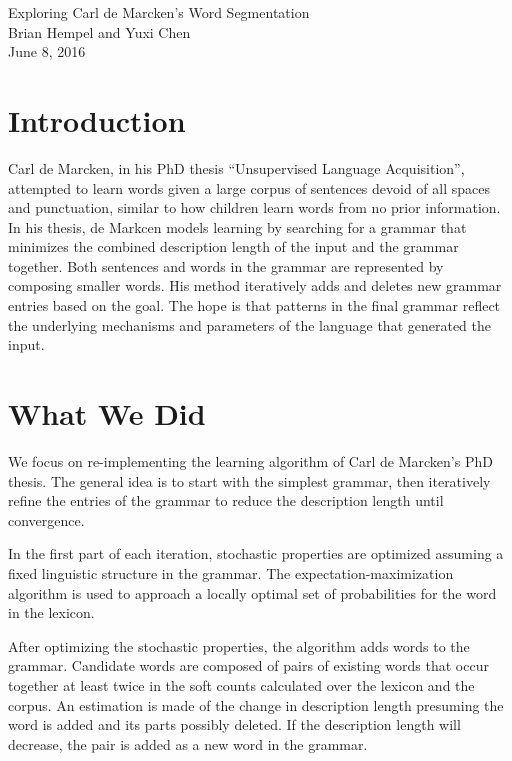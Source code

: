 \documentclass[11pt, oneside, fleqn]{article}
\begin{document}
  \begin{center}
  \LARGE{Exploring Carl de Marcken's Word Segmentation}\\[0.5em]
  \large{Brian Hempel and Yuxi Chen}\\[0.5em]
  \large{June 8, 2016}\\[0.5em]
  \end{center}

  \vspace{1em}

  \section{Introduction}

  Carl de Marcken, in his PhD thesis ``Unsupervised Language Acquisition'', attempted to learn words given a large corpus of sentences devoid of all spaces and punctuation, similar to how children learn words from no prior information. In his thesis, de Markcen models learning by searching for a grammar that minimizes the combined description length of the input and the grammar together. Both sentences and words in the grammar are represented by composing smaller words. His method iteratively adds and deletes new grammar entries based on the goal. The hope is that patterns in the final grammar reflect the underlying mechanisms and parameters of the language that generated the input.
  
  \section{What We Did}

  We focus on re-implementing the learning algorithm of Carl de Marcken's PhD thesis. The general idea is to start with the simplest grammar, then iteratively refine the entries of the grammar to reduce the description length until convergence. 
  
  In the first part of each iteration, stochastic properties are optimized assuming a fixed linguistic structure in the grammar. The expectation-maximization algorithm is used to approach a locally optimal set of probabilities for the word in the lexicon.
 
  After optimizing the stochastic properties, the algorithm adds words to the grammar. Candidate words are composed of pairs of existing words that occur together at least twice in the soft counts calculated over the lexicon and the corpus. An estimation is made of the change in description length presuming the word is added and its parts possibly deleted. If the description length will decrease, the pair is added as a new word in the grammar.
\end{document}
